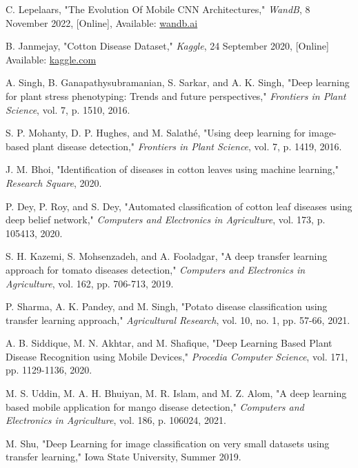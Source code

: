 \documentclass[conference]{IEEEtran}
\begin{document}
\begin{thebibliography}{00}
 C. Lepelaars, "The Evolution Of Mobile CNN Architectures," \textit{WandB}, 8 November 2022, [Online], Available: \href{https://wandb.ai/carlolepelaars/mobile_architectures/reports/The-Evolution-Of-Mobile-CNN-Architectures--VmlldzoyMDQ0ODQ}{wandb.ai}

 B. Janmejay, "Cotton Disease Dataset," \textit{Kaggle}, 24 September 2020, [Online] Available: \href{https://www.kaggle.com/janmejaybhoi/cotton-disease-dataset/notebooks}{kaggle.com}


 A. Singh, B. Ganapathysubramanian, S. Sarkar, and A. K. Singh, "Deep learning for plant stress phenotyping: Trends and future perspectives," \textit{Frontiers in Plant Science}, vol. 7, p. 1510, 2016.

 S. P. Mohanty, D. P. Hughes, and M. Salathé, "Using deep learning for image-based plant disease detection," \textit{Frontiers in Plant Science}, vol. 7, p. 1419, 2016.

 J. M. Bhoi, "Identification of diseases in cotton leaves using machine learning," \textit{Research Square}, 2020.

 P. Dey, P. Roy, and S. Dey, "Automated classification of cotton leaf diseases using deep belief network," \textit{Computers and Electronics in Agriculture}, vol. 173, p. 105413, 2020.

 S. H. Kazemi, S. Mohsenzadeh, and A. Fooladgar, "A deep transfer learning approach for tomato diseases detection," \textit{Computers and Electronics in Agriculture}, vol. 162, pp. 706-713, 2019.

 P. Sharma, A. K. Pandey, and M. Singh, "Potato disease classification using transfer learning approach," \textit{Agricultural Research}, vol. 10, no. 1, pp. 57-66, 2021.

 A. B. Siddique, M. N. Akhtar, and M. Shafique, "Deep Learning Based Plant Disease Recognition using Mobile Devices," \textit{Procedia Computer Science}, vol. 171, pp. 1129-1136, 2020.

 M. S. Uddin, M. A. H. Bhuiyan, M. R. Islam, and M. Z. Alom, "A deep learning based mobile application for mango disease detection," \textit{Computers and Electronics in Agriculture}, vol. 186, p. 106024, 2021.

 M. Shu, "Deep Learning for image classification on very small datasets using transfer learning," Iowa State University, Summer 2019.


\end{thebibliography}
\end{document}
